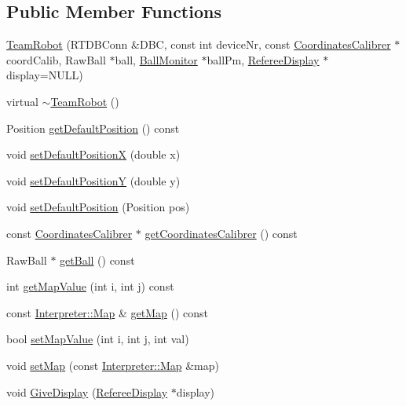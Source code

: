 \subsection*{Public Member Functions}
\begin{DoxyCompactItemize}
\item 
\hyperlink{classTeamRobot_a4b116f58f0a1568a886d03b0c71df20c}{TeamRobot} (RTDBConn \&DBC, const int deviceNr, const \hyperlink{classCoordinatesCalibrer}{CoordinatesCalibrer} $\ast$coordCalib, RawBall $\ast$ball, \hyperlink{classBallMonitor}{BallMonitor} $\ast$ballPm, \hyperlink{classRefereeDisplay}{RefereeDisplay} $\ast$display=NULL)
\item 
virtual \hyperlink{classTeamRobot_a7be9d5161b7524cbbb6ae486ad4a1b42}{$\sim$TeamRobot} ()
\item 
Position \hyperlink{classTeamRobot_acd11ff6d9651a8deddafa5bd9a30865c}{getDefaultPosition} () const 
\item 
void \hyperlink{classTeamRobot_a527cefdb32f2bc0a4fa770207d4dc934}{setDefaultPositionX} (double x)
\item 
void \hyperlink{classTeamRobot_afeb86cb88b18030049d525d1d6790e6e}{setDefaultPositionY} (double y)
\item 
void \hyperlink{classTeamRobot_a322f046e260aedff6f2c8edc5730c9ac}{setDefaultPosition} (Position pos)
\item 
const \hyperlink{classCoordinatesCalibrer}{CoordinatesCalibrer} $\ast$ \hyperlink{classTeamRobot_a3ef7d4538226085ed4d92b8bd2fce67d}{getCoordinatesCalibrer} () const 
\item 
RawBall $\ast$ \hyperlink{classTeamRobot_a86dbc3bbf6fdcebd4ae41a6f68d92a15}{getBall} () const 
\item 
int \hyperlink{classTeamRobot_abc3a5d2d4cac44629a9d8851164b5eda}{getMapValue} (int i, int j) const 
\item 
const \hyperlink{classMatrix}{Interpreter::Map} \& \hyperlink{classTeamRobot_a8b5fa0d9f42166fc3339ec901fad5a91}{getMap} () const 
\item 
bool \hyperlink{classTeamRobot_a28ee2460e7d465989bb0582782db851e}{setMapValue} (int i, int j, int val)
\item 
void \hyperlink{classTeamRobot_ab8c92b6228aed8eef31d0b1b0fce8690}{setMap} (const \hyperlink{classMatrix}{Interpreter::Map} \&map)
\item 
void \hyperlink{classTeamRobot_a2caa2411b9972fa5caa595f568394ba0}{GiveDisplay} (\hyperlink{classRefereeDisplay}{RefereeDisplay} $\ast$display)
\item 

\end{DoxyCompactItemize}
